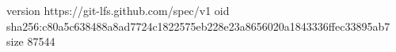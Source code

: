 version https://git-lfs.github.com/spec/v1
oid sha256:c80a5c638488a8ad7724c1822575eb228e23a8656020a1843336ffec33895ab7
size 87544
